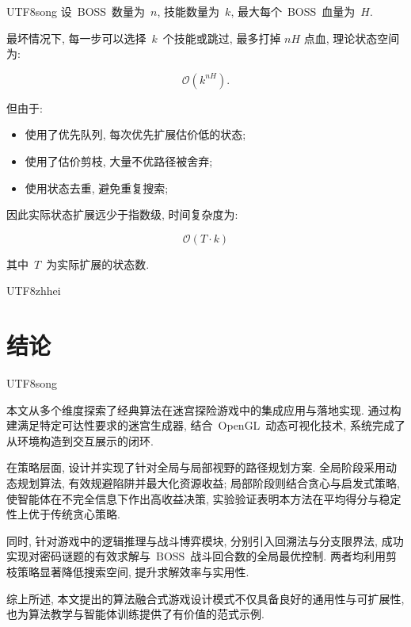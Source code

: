 \documentclass[10.5pt,compsoc]{CjC}
\theoremstyle{mystyle}
\begin{document}
\begin{CJK*}{UTF8}{song}
设~BOSS~数量为~$n$, 技能数量为~$k$, 最大每个~BOSS~血量为~$H$.

最坏情况下, 每一步可以选择~$k$~个技能或跳过, 最多打掉 $nH$ 点血, 理论状态空间为:

\[
\mathcal{O}(k^{nH}).
\]

但由于: 

\begin{itemize}
  \item 使用了优先队列, 每次优先扩展估价低的状态;
  \item 使用了估价剪枝, 大量不优路径被舍弃;
  \item 使用状态去重, 避免重复搜索;
\end{itemize}

因此实际状态扩展远少于指数级, 时间复杂度为:

\[
\mathcal{O}(T \cdot k)
\]

\vskip 10mm

其中~$T$~为实际扩展的状态数.

\end{CJK*}


\begin{CJK*}{UTF8}{zhhei}
\vskip 1mm
\section{结论}
\end{CJK*}

\begin{CJK*}{UTF8}{song}

本文从多个维度探索了经典算法在迷宫探险游戏中的集成应用与落地实现.
通过构建满足特定可达性要求的迷宫生成器,
结合~\textrm{OpenGL}~动态可视化技术,
系统完成了从环境构造到交互展示的闭环.

在策略层面, 设计并实现了针对全局与局部视野的路径规划方案.
全局阶段采用动态规划算法, 有效规避陷阱并最大化资源收益;
局部阶段则结合贪心与启发式策略, 使智能体在不完全信息下作出高收益决策,
实验验证表明本方法在平均得分与稳定性上优于传统贪心策略.


同时, 针对游戏中的逻辑推理与战斗博弈模块, 分别引入回溯法与分支限界法,
成功实现对密码谜题的有效求解与~$\textrm{BOSS}$~战斗回合数的全局最优控制.
两者均利用剪枝策略显著降低搜索空间, 提升求解效率与实用性.

综上所述, 本文提出的算法融合式游戏设计模式不仅具备良好的通用性与可扩展性,
也为算法教学与智能体训练提供了有价值的范式示例.

\end{CJK*}
\end{document}
